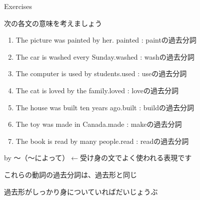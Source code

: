 \documentclass[aspectratio=169,xcolor={dvipsnames,table}]{beamer}
\newcommand{\myaudio}[1]{\href{#1}{\faVolumeUp}}
\begin{document}
\begin{frame}[plain]{Exercises}
 
{\small 次の各文の意味を考えましょう}\hfill{\scriptsize \myaudio{./audio/051_passive_02.mp3}}

\begin{enumerate}
 \item The picture was painted by her.\hfill{}{ \scriptsize painted : paintの過去分詞}
 \item The car is washed every Sunday.\hfill{}{\scriptsize washed : washの過去分詞}
 \item The computer is used by students.\hfill{}{\scriptsize used  : useの過去分詞}
 \item The cat is loved by the family.\hfill{}{\scriptsize loved  : loveの過去分詞}
 \item The house was built ten years ago.\hfill{}{\scriptsize built  : buildの過去分詞}
 \item The toy was made in Canada.\hfill{}{\scriptsize made  : makeの過去分詞}
 \item The book is read by many people.\hfill{}{\scriptsize read  : readの過去分詞}
\end{enumerate}

\hfill{\scriptsize by ～（～によって）$\longleftarrow$受け身の文でよく使われる表現です}

\pause

\hfill{\small これらの動詞の過去分詞は、過去形と同じ}

\vspace{-5pt}

\hfill{\small 過去形がしっかり身についていればだいじょうぶ}
\end{frame}
\end{document}
